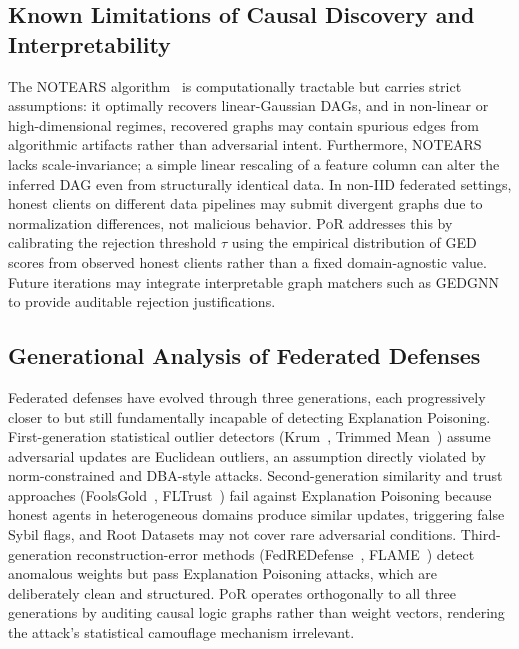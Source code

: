 \documentclass[journal]{IEEEtran}
\newcommand{\por}{\textsc{PoR}}
\newcommand{\notears}{\textsc{NOTEARS}}
\begin{document}
\subsection{Known Limitations of Causal Discovery and Interpretability}
\label{sec:notears_limits}

The \notears{} algorithm~\cite{zheng2018notears} is computationally tractable
but carries strict assumptions: it optimally recovers linear-Gaussian DAGs,
and in non-linear or high-dimensional regimes, recovered graphs may contain
spurious edges from algorithmic artifacts rather than adversarial intent.
Furthermore, \notears{} lacks scale-invariance; a simple linear rescaling
of a feature column can alter the inferred DAG even from structurally
identical data. In non-IID federated settings, honest clients on different
data pipelines may submit divergent graphs due to normalization differences,
not malicious behavior. \por{} addresses this by calibrating the rejection
threshold $\tau$ using the empirical distribution of GED scores from observed
honest clients rather than a fixed domain-agnostic value. Future iterations
may integrate interpretable graph matchers such as
GEDGNN~\cite{piao2023gedgnn} to provide auditable rejection justifications.

\subsection{Generational Analysis of Federated Defenses}
\label{sec:genanalysis}

Federated defenses have evolved through three generations, each progressively
closer to but still fundamentally incapable of detecting Explanation Poisoning.
First-generation statistical outlier detectors
(Krum~\cite{blanchard2017krum}, Trimmed Mean~\cite{yin2018byzantinerobust})
assume adversarial updates are Euclidean outliers, an assumption directly
violated by norm-constrained and DBA-style attacks. Second-generation
similarity and trust approaches (FoolsGold~\cite{fung2020foolsgold},
FLTrust~\cite{cao2021fltrust}) fail against Explanation Poisoning because
honest agents in heterogeneous domains produce similar updates, triggering
false Sybil flags, and Root Datasets may not cover rare adversarial
conditions. Third-generation reconstruction-error methods
(FedREDefense~\cite{zhang2024fedredefense}, FLAME~\cite{nguyen2021flame})
detect anomalous weights but pass Explanation Poisoning attacks, which are
deliberately clean and structured. \por{} operates orthogonally to all three
generations by auditing causal logic graphs rather than weight vectors,
rendering the attack's statistical camouflage mechanism irrelevant.
\end{document}
